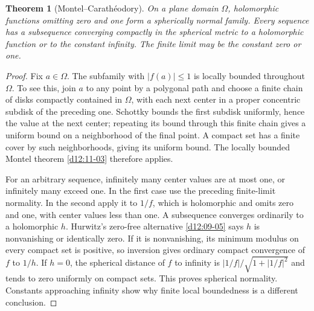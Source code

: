 \documentclass[11pt,a4paper,openany]{book}
\newtheorem{theorem}{Theorem}[chapter]
\theoremstyle{definition}
\theoremstyle{remark}\newtheorem{remark}[theorem]{Remark}
\newcommand{\family}[1]{}
\begin{document}
\begin{theorem}[Montel--Carath\'eodory]\label{d12:23-04}\family{D12.23.04}
On a plane domain $\Omega$, holomorphic functions omitting zero and
one form a spherically normal family. Every sequence has a subsequence
converging compactly in the spherical metric to a holomorphic function
or to the constant infinity. The finite limit may be the constant zero
or one.
\end{theorem}
\begin{proof}
Fix $a\in\Omega$. The subfamily with $|f(a)|\le1$ is locally bounded
throughout $\Omega$. To see this, join $a$ to any point by a polygonal
path and choose a finite chain of disks compactly contained in $\Omega$,
with each next center in a proper concentric subdisk of the preceding
one. Schottky bounds the first subdisk uniformly, hence the value at
the next center; repeating its bound through this finite chain gives
a uniform bound on a neighborhood of the final point. A compact set
has a finite cover by such neighborhoods, giving its uniform bound.
The locally bounded Montel theorem \cref{d12:11-03} therefore applies.

For an arbitrary sequence, infinitely many center values are at most
one, or infinitely many exceed one. In the first case use the preceding
finite-limit normality. In the second apply it to $1/f$, which is
holomorphic and omits zero and one, with center values less than one.
A subsequence converges ordinarily to a holomorphic $h$. Hurwitz's
zero-free alternative \cref{d12:09-05} says $h$ is nonvanishing or
identically zero. If it is nonvanishing, its minimum modulus on every
compact set is positive, so inversion gives ordinary compact convergence
of $f$ to $1/h$. If $h=0$, the spherical distance of $f$ to infinity
is $|1/f|/\sqrt{1+|1/f|^2}$ and tends to zero uniformly on compact
sets. This proves spherical normality. Constants approaching infinity
show why finite local boundedness is a different conclusion.
\end{proof}
\end{document}
